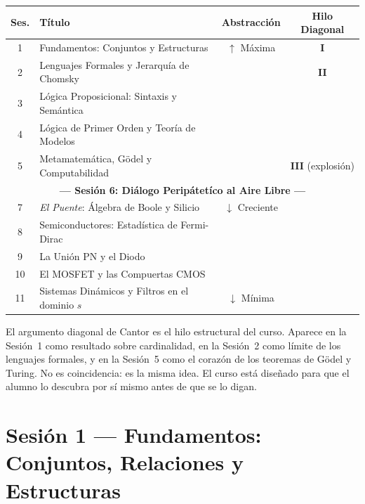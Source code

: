 \documentclass[11pt, letterpaper]{article}
\begin{document}
\begin{center}
\renewcommand{\arraystretch}{1.45}
\begin{tabular}{clcc}
\toprule
\textbf{Ses.} & \textbf{T\'itulo} & \textbf{Abstracci\'on} & \textbf{Hilo Diagonal} \\
\midrule
1  & Fundamentos: Conjuntos y Estructuras        & $\uparrow$ M\'axima & \textcolor{diagonalred}{\textbf{I}} \\
2  & Lenguajes Formales y Jerarqu\'ia de Chomsky & & \textcolor{diagonalred}{\textbf{II}} \\
3  & L\'ogica Proposicional: Sintaxis y Sem\'antica & & \\
4  & L\'ogica de Primer Orden y Teor\'ia de Modelos & & \\
5  & Metamatem\'atica, G\"odel y Computabilidad & & \textcolor{diagonalred}{\textbf{III} (explosi\'on)} \\
\midrule
\multicolumn{4}{c}{\textcolor{outdoorgreen}{\textbf{--- Sesi\'on 6: Di\'alogo Perip\'atet\'ico al Aire Libre ---}}} \\
\midrule
7  & \textit{El Puente}: \'Algebra de Boole y Silicio & $\downarrow$ Creciente & \\
8  & Semiconductores: Estad\'istica de Fermi-Dirac & & \\
9  & La Uni\'on PN y el Diodo                   & & \\
10 & El MOSFET y las Compuertas CMOS            & & \\
11 & Sistemas Din\'amicos y Filtros en el dominio $s$ & $\downarrow$ M\'inima & \\
\bottomrule
\end{tabular}
\end{center}

\vspace{0.4em}
\begin{nota}
El argumento diagonal de Cantor es el hilo estructural del curso.
Aparece en la Sesi\'on~1 como resultado sobre cardinalidad,
en la Sesi\'on~2 como l\'imite de los lenguajes formales,
y en la Sesi\'on~5 como el coraz\'on de los teoremas de G\"odel y Turing.
No es coincidencia: es la misma idea. El curso est\'a dise\~nado para que
el alumno lo descubra por s\'i mismo antes de que se lo digan.
\end{nota}

\newpage

\section{Sesi\'on 1 --- Fundamentos: Conjuntos, Relaciones y Estructuras}
\end{document}
